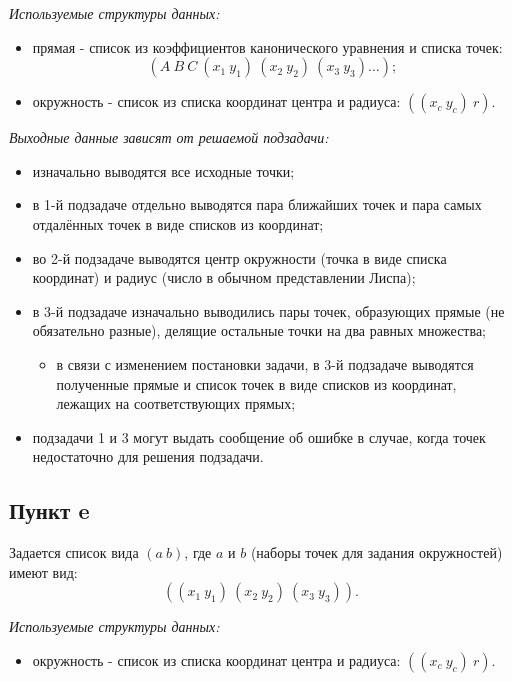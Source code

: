 \documentclass[a4paper, 11pt]{article}
\begin{document}
\textit{Используемые структуры данных:}
\begin{itemize}
  \item прямая - список из коэффициентов канонического уравнения и списка точек: \[(A\ B\ C\ (x_1\ y_1)\ (x_2\ y_2)\ (x_3\ y_3)\dots);\]
  \item окружность - список из списка координат центра и радиуса: $((x_c\ y_c)\ r)$.
\end{itemize}

\textit{Выходные данные зависят от решаемой подзадачи:}
\begin{itemize}
  \item изначально выводятся все исходные точки;
  \item в 1-й подзадаче отдельно выводятся пара ближайших точек и пара самых отдалённых точек в виде списков из координат;
  \item во 2-й подзадаче выводятся центр окружности (точка в виде списка координат) и радиус (число в обычном представлении Лиспа);
  \item в 3-й подзадаче изначально выводились пары точек, образующих прямые (не обязательно разные), делящие остальные точки на два равных множества;
  \begin{itemize}
    \item в связи с изменением постановки задачи, в 3-й подзадаче выводятся полученные прямые и список точек в виде списков из координат, лежащих на соответствующих прямых; 
  \end{itemize}
  \item подзадачи 1 и 3 могут выдать сообщение об ошибке в случае, когда точек недостаточно для решения подзадачи.
\end{itemize}

\subsection*{Пункт e}
Задается список вида $(a\ b)$, где $a$ и $b$ (наборы точек для задания окружностей) имеют вид:
\[
((x_1\ y_1)\ (x_2\ y_2)\ (x_3\ y_3)).
\]

\textit{Используемые структуры данных:}
\begin{itemize}
  \item окружность - список из списка координат центра и радиуса: $((x_c\ y_c)\ r)$.
\end{itemize}
\end{document}
